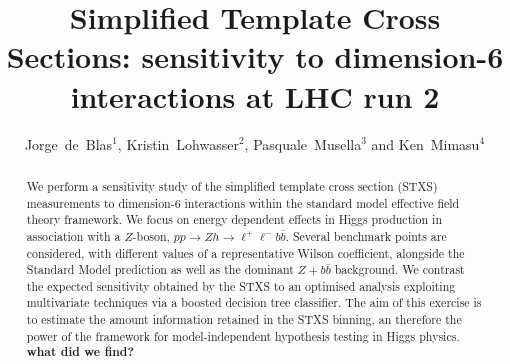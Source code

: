 \documentclass[11pt]{cernrep}
\begin{document}
\title{
Simplified Template Cross Sections: sensitivity to dimension-6 interactions at LHC run 2}
\author{Jorge~de~Blas$^1$,
Kristin~Lohwasser$^2$, Pasquale~Musella$^3$ and Ken~Mimasu$^4$}
\maketitle

\begin{abstract}
We perform a sensitivity study of the simplified template cross section (STXS) measurements to dimension-6 interactions within the standard model effective field theory framework. We focus on energy dependent effects in Higgs production in association with a $Z$-boson, $p p \to Z h \to \ell^+\ell^- b\bar{b}$. Several benchmark points are considered, with different values of a representative Wilson coefficient, alongside the Standard Model prediction as well as the dominant $Z+b\bar{b}$ background. We contrast the expected sensitivity obtained by the STXS to an optimised analysis exploiting multivariate techniques via a boosted decision tree classifier. The aim of this exercise is to estimate the amount information retained in the STXS binning, an therefore the power of the framework for model-independent hypothesis testing in Higgs physics. \textbf{what did we find?}
\end{abstract}


\newpage
\end{document}
